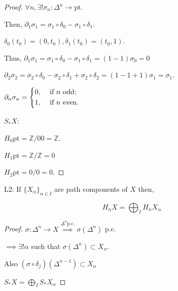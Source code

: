\documentclass{article}
\theoremstyle{definition}
\begin{document}
    \begin{proof}
        \(\forall n, \exists ! \sigma_n : \Delta^n \to \text{pt}\).

        Then, \(\partial_1 \sigma_1 = \sigma_1 \circ \delta_0 - \sigma_1 \circ \delta_1\).

        \(\delta_0(t_0) = (0,t_0), \delta_1(t_0) = (t_0, 1)\).

        Thus, \(\partial_1 \sigma_1 = \sigma_1 \circ \delta_0 - \sigma_1 \circ \delta_1=(1-1)\sigma_0 = 0\)
        
        \(\partial_2 \sigma_2 = \sigma_2 \circ \delta_0 - \sigma_2 \circ \delta_1 + \sigma_2 \circ \delta_2 = (1-1+1)\sigma_1 = \sigma_1\).

        \(\partial_n \sigma_n = \begin{dcases}
            0, &\text{ if } n \text{ odd} ;\\
            1, &\text{ if } n \text{ even}.
        \end{dcases}\) 

        \(S_{\ast} X:\)
        
        \begin{center}
        \end{center}

        \(H_0 \text{pt} = \mathbb{Z} / 00 = \mathbb{Z}\).

        \(H_1 \text{pt} = \mathbb{Z} / \mathbb{Z} = 0\) 

        \(H_2 \text{pt} = 0 / 0 = 0\).
    \end{proof}

    L2: If \(\{ X_\alpha \}_{\alpha \in I}\) are path components of \(X\) then,

    \[
        H_n X = \bigoplus_{I} H_n X_\alpha
    \]

    \begin{proof}
        \(\sigma: \Delta^n \to X \overset{\Delta^n \text{p.c.}}{\implies} \sigma(\Delta^n)\) p.c.

        \(\implies \exists ! \alpha\) such that \(\sigma(\Delta^n) \subset X_\alpha\).

        Also \((\sigma \circ \delta_j)(\Delta^{n-1}) \subset X_\alpha\)
        
        \(S_{\ast} X = \bigoplus_{I} S_{\ast} X_\alpha\) 
    \end{proof}
\end{document}
